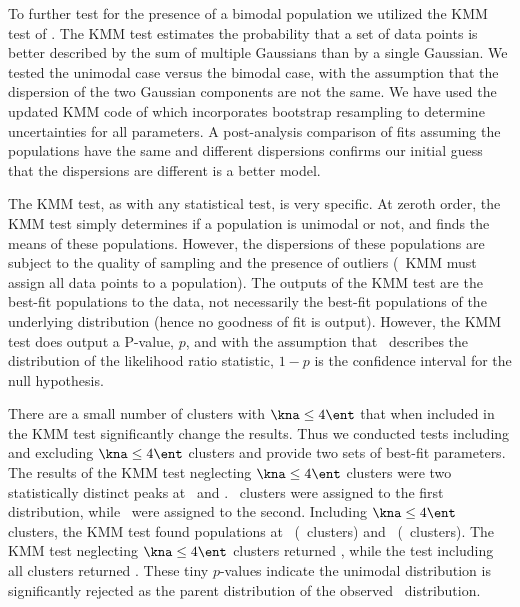 \documentclass[apj]{emulateapj}
\begin{document}
To further test for the presence of a bimodal population we utilized
the KMM test of \citet{kmm1}. The KMM test estimates the probability
that a set of data points is better described by the sum of multiple
Gaussians than by a single Gaussian. We tested the unimodal case
versus the bimodal case, with the assumption that the dispersion of
the two Gaussian components are not the same. We have used the updated
KMM code of \citet{kmm2} which incorporates bootstrap resampling to
determine uncertainties for all parameters. A post-analysis comparison
of fits assuming the populations have the same and different
dispersions confirms our initial guess that the dispersions are
different is a better model.

The KMM test, as with any statistical test, is very specific. At
zeroth order, the KMM test simply determines if a population is
unimodal or not, and finds the means of these populations. However,
the dispersions of these populations are subject to the quality of
sampling and the presence of outliers (\eg\ KMM must assign all data
points to a population). The outputs of the KMM test are the best-fit
populations to the data, not necessarily the best-fit populations of
the underlying distribution (hence no goodness of fit is
output). However, the KMM test does output a P-value, $p$, and with
the assumption that \chisq\ describes the distribution of the
likelihood ratio statistic, $1-p$ is the confidence interval for the
null hypothesis.

There are a small number of clusters with $\kna \le 4 \ent$ that when
included in the KMM test significantly change the results. Thus we
conducted tests including and excluding $\kna \le 4 \ent$ clusters and
provide two sets of best-fit parameters. The results of the KMM test
neglecting $\kna \le 4 \ent$ clusters were two statistically distinct
peaks at \kmma\ and \kmmb. \kmmc\ clusters were assigned to the first
distribution, while \kmmd\ were assigned to the second. Including
$\kna \le 4 \ent$ clusters, the KMM test found populations at \kmmf\
(\kmmh\ clusters) and \kmmg\ (\kmmi\ clusters). The KMM test
neglecting $\kna \le 4 \ent$ clusters returned \kmme, while the test
including all clusters returned \kmmj. These tiny $p$-values indicate
the unimodal distribution is significantly rejected as the parent
distribution of the observed \kna\ distribution.
\end{document}
